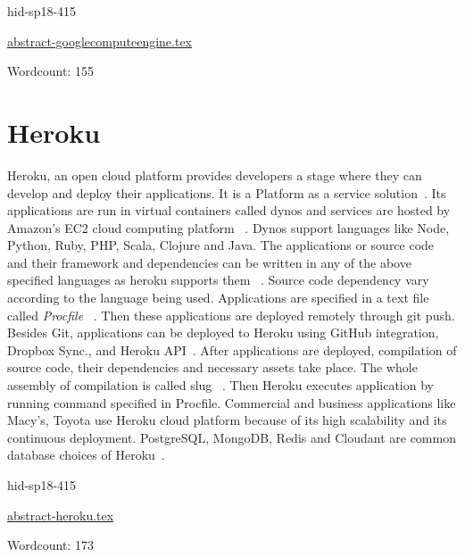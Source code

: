 \begin{IU}

hid-sp18-415

\href{https://github.com/cloudmesh-community/hid-sp18-415/blob/master//technology/abstract-googlecomputeengine.tex}{abstract-googlecomputeengine.tex}

 

Wordcount: 155

\end{IU}

\section{Heroku}
 
Heroku, an open cloud platform provides developers a stage where they
can develop and deploy their applications. It is a Platform as a
service solution~\cite{hid-sp18-415-www-heroku}.  Its applications
are run in virtual containers called dynos and services are hosted by
Amazon’s EC2 cloud computing platform
~\cite{hid-sp18-415-wiki-heroku}. Dynos support languages like Node,
Python, Ruby, PHP, Scala, Clojure and Java. The applications or source
code and their framework and dependencies can be written in any of the
above specified languages as heroku supports them
~\cite{hid-sp18-415-how-heroku-works}. Source code dependency vary
according to the language being used. Applications are specified in a
text file called \textit{Procfile}
~\cite{hid-sp18-415-how-heroku-works}. Then these applications are
deployed remotely through git push. Besides Git, applications can be
deployed to Heroku using GitHub integration, Dropbox Sync., and Heroku
API~\cite{hid-sp18-415-how-heroku-works}. After applications are
deployed, compilation of source code, their dependencies and necessary
assets take place. The whole assembly of compilation is called slug
~\cite{hid-sp18-415-how-heroku-works}.  Then Heroku executes
application by running command specified in Procfile.  Commercial and
business applications like Macy’s, Toyota use Heroku cloud platform
because of its high scalability and its continuous
deployment. PostgreSQL, MongoDB, Redis and Cloudant are common
database choices of Heroku~\cite{hid-sp18-415-www-heroku}.


\begin{IU}

hid-sp18-415

\href{https://github.com/cloudmesh-community/hid-sp18-415/blob/master//technology/abstract-heroku.tex}{abstract-heroku.tex}

 

Wordcount: 173

\end{IU}

